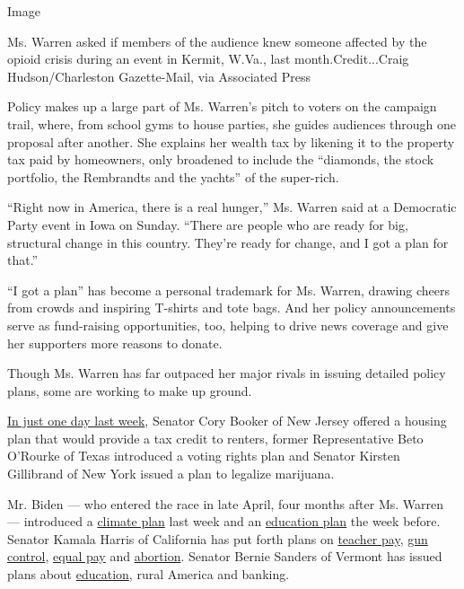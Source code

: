 Image

Ms. Warren asked if members of the audience knew someone affected by the
opioid crisis during an event in Kermit, W.Va., last
month.Credit...Craig Hudson/Charleston Gazette-Mail, via Associated
Press

Policy makes up a large part of Ms. Warren's pitch to voters on the
campaign trail, where, from school gyms to house parties, she guides
audiences through one proposal after another. She explains her wealth
tax by likening it to the property tax paid by homeowners, only
broadened to include the ``diamonds, the stock portfolio, the Rembrandts
and the yachts'' of the super-rich.

``Right now in America, there is a real hunger,'' Ms. Warren said at a
Democratic Party event in Iowa on Sunday. ``There are people who are
ready for big, structural change in this country. They're ready for
change, and I got a plan for that.''

``I got a plan'' has become a personal trademark for Ms. Warren, drawing
cheers from crowds and inspiring T-shirts and tote bags. And her policy
announcements serve as fund-raising opportunities, too, helping to drive
news coverage and give her supporters more reasons to donate.

Though Ms. Warren has far outpaced her major rivals in issuing detailed
policy plans, some are working to make up ground.

\href{https://www.nytimes.com/2019/06/05/us/politics/booker-renters-credit.html}{In
just one day last week}, Senator Cory Booker of New Jersey offered a
housing plan that would provide a tax credit to renters, former
Representative Beto O'Rourke of Texas introduced a voting rights plan
and Senator Kirsten Gillibrand of New York issued a plan to legalize
marijuana.

Mr. Biden --- who entered the race in late April, four months after Ms.
Warren --- introduced a
\href{https://www.nytimes.com/2019/06/04/us/politics/joe-biden-climate-plan.html}{climate
plan} last week and an
\href{https://www.nytimes.com/2019/05/28/us/politics/biden-education-plan-2020.html}{education
plan} the week before. Senator Kamala Harris of California has put forth
plans on
\href{https://www.nytimes.com/2019/03/26/us/politics/kamala-harris-teacher-pay.html}{teacher
pay},
\href{https://www.nytimes.com/2019/04/22/us/politics/kamala-harris-gun-control.html}{gun
control},
\href{https://www.nytimes.com/2019/05/20/us/politics/kamala-harris-gender-pay-gap.html}{equal
pay} and
\href{https://www.nytimes.com/2019/05/28/us/politics/kamala-harris-abortion.html}{abortion}.
Senator Bernie Sanders of Vermont has issued plans about
\href{https://www.nytimes.com/2019/05/18/us/bernie-sanders-education-plan.html}{education},
rural America and banking.

